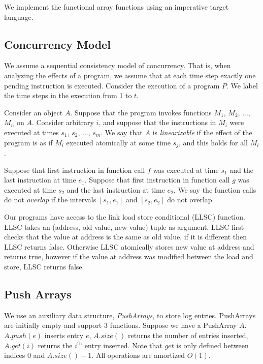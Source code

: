 \documentclass[preprint]{sigplanconf}
\begin{document}
We implement the functional array functions using an imperative target language.

\subsection{Concurrency Model}

We assume a sequential consistency model of concurrency. That is, when analyzing the effects of a program, we assume that at each time step exactly one pending instruction is executed. Consider the execution of a program $P$. We label the time steps in the execution from 1 to $t$. 

\begin{definition}
Consider an object $A$. Suppose that the program invokes functions $M_1$, $M_2$, ..., $M_n$ on $A$. Consider arbitrary $i$, and suppose that the instructions in $M_i$ were executed at times $s_1$, $s_2$, ..., $s_m$. We say that $A$ is \emph{linearizable} if the effect of the program is as if $M_i$ executed atomically at some time $s_j$, and this holds for all $M_i$.
\end{definition}

\begin{definition}
Suppose that first instruction in function call $f$ was executed at time $s_1$ and the last instruction at time $e_1$. Suppose that first instruction in function call $g$ was executed at time $s_2$ and the last instruction at time $e_2$. We say the function calls do not \emph{overlap} if the intervals $[s_1, e_1]$ and $[s_2, e_2]$ do not overlap.
\end{definition} 

Our programs have access to the link load store conditional (LLSC) function. LLSC takes an (address, old value, new value) tuple as argument. LLSC first checks that the value at address is the same as old value, if it is different then LLSC returns false. Otherwise LLSC atomically stores new value at address and returns true, however if the value at address was modified between the load and store, LLSC returns false.

\subsection{Push Arrays}

We use an auxiliary data structure, \emph{PushArrays}, to store log entries. PushArrays are initially empty and support 3 functions. Suppose we have a PushArray $A$. $A.push(e)$ inserts entry $e$, $A.size()$ returns the number of entries inserted, $A.get(i)$ returns the $i^{\text{th}}$ entry inserted. Note that $get$ is only defined between indices 0 and $A.size()-1$. All operations are amortized $O(1)$.
\end{document}

